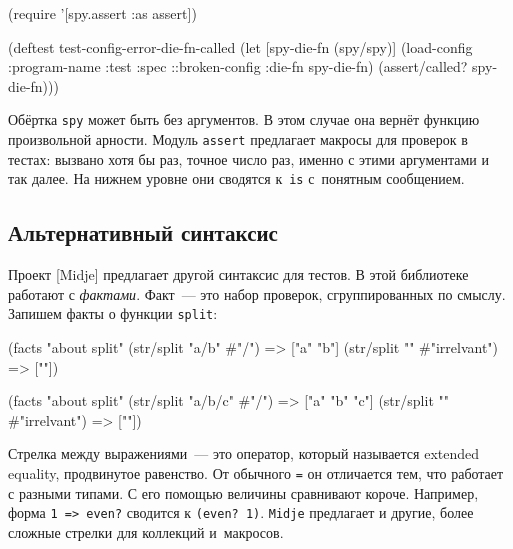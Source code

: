 \begin{english}
  \begin{clojure}
(require '[spy.assert :as assert])

(deftest test-config-error-die-fn-called
  (let [spy-die-fn (spy/spy)]
    (load-config {:program-name :test
                  :spec ::broken-config
                  :die-fn spy-die-fn})
    (assert/called? spy-die-fn)))
  \end{clojure}
\end{english}

Обёртка \verb|spy| может быть без аргументов. В этом случае она вернёт
функцию произвольной арности. Модуль \verb|assert| предлагает макросы для
проверок в тестах: вызвано хотя бы раз, точное число раз, именно с этими
аргументами и так далее. На нижнем уровне они сводятся к~\verb|is| с~понятным
сообщением.

\subsection{Альтернативный синтаксис}


Проект [Midje] предлагает другой
синтаксис для тестов. В этой библиотеке работают с \emph{фактами}. Факт~--- это
набор проверок, сгруппированных по смыслу. Запишем факты о функции
\verb|split|:

\ifx\DEVICETYPE\MOBILE

\begin{english}
  \begin{clojure}
(facts "about split"
 (str/split "a/b" #"/") => ["a" "b"]
 (str/split "" #"irrelvant") => [""])
  \end{clojure}
\end{english}

\else

\begin{english}
  \begin{clojure}
(facts "about split"
 (str/split "a/b/c" #"/") => ["a" "b" "c"]
 (str/split "" #"irrelvant") => [""])
  \end{clojure}
\end{english}

\fi


Стрелка между выражениями~--- это оператор, который называется extended
equality, продвинутое равенство. От обычного \verb|=| он отличается тем, что
работает с разными типами. С его помощью величины сравнивают короче. Например,
форма \verb|1 => even?| сводится к \verb|(even? 1)|. \verb|Midje| предлагает и
другие, более сложные стрелки для коллекций и~макросов.

